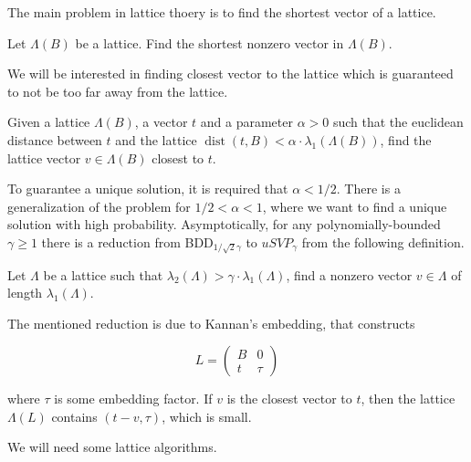The main problem in lattice thoery is to find the shortest vector of a lattice.

\begin{definition}
    Let $\Lambda(B)$ be a lattice. Find the shortest nonzero vector in $\Lambda(B)$.
\end{definition}

We will be interested in finding closest vector to the lattice which is guaranteed to not be too far away from the lattice.

\begin{definition}
    Given a lattice $\Lambda(B)$, a vector $t$ and a parameter $ \alpha > 0$ such that the euclidean distance between $t$ and the lattice $\operatorname*{dist}(t,B) < \alpha \cdot \lambda_1(\Lambda(B))$, find the lattice vector $v \in \Lambda(B)$ closest to $t$.
\end{definition}

To guarantee a unique solution, it is required that $\alpha < 1/2$. There is a generalization of the problem for $1/2 < \alpha < 1$, where we want to find a unique solution with high probability. Asymptotically, for any polynomially-bounded $\gamma \geq 1$ there is a reduction from BDD$_{1/\sqrt{2}\gamma}$ to $uSVP_\gamma$ from the following definition.

\begin{definition}
    Let $\Lambda$ be a lattice such that $\lambda_2(\Lambda) > \gamma \cdot \lambda_1(\Lambda)$, find a nonzero vector $v \in \Lambda$ of length $\lambda_1(\Lambda)$.
\end{definition}

The mentioned reduction is due to Kannan's embedding, that constructs

\begin{equation*}
    L = \begin{pmatrix} 
        B & 0 \\ 
        t & \tau 
        \end{pmatrix}
\end{equation*}

where $\tau$ is some embedding factor. If $v$ is the closest vector to $t$, then the lattice $\Lambda(L)$ contains $(t - v, \tau)$, which is small.

We will need some lattice algorithms.

